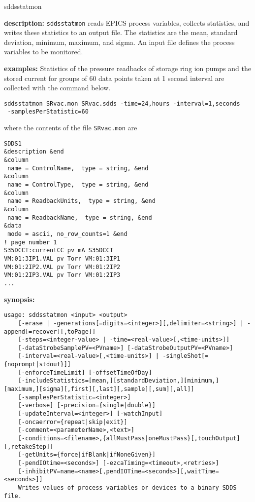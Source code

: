 \begin{sddsprog}{sddsstatmon}
\item \textbf{description:}
\verb+sddsstatmon+ reads EPICS process variables, collects statistics,
and writes these statistics to an output file.
The statistics are the mean, standard deviation, minimum, maximum, and sigma.
An input file defines the process variables to be monitored.
\item \textbf{examples:}
Statistics of the pressure readbacks of storage ring ion pumps and the stored current
for groups of 60 data points taken at 1 second interval are collected
with the command below.
\begin{verbatim}
sddsstatmon SRvac.mon SRvac.sdds -time=24,hours -interval=1,seconds 
 -samplesPerStatistic=60
\end{verbatim}
where the contents of the file \verb+SRvac.mon+ are
\begin{verbatim}
SDDS1
&description &end
&column
 name = ControlName,  type = string, &end
&column
 name = ControlType,  type = string, &end
&column
 name = ReadbackUnits,  type = string, &end
&column
 name = ReadbackName,  type = string, &end
&data
 mode = ascii, no_row_counts=1 &end
! page number 1
S35DCCT:currentCC pv mA S35DCCT
VM:01:3IP1.VAL pv Torr VM:01:3IP1
VM:01:2IP2.VAL pv Torr VM:01:2IP2
VM:01:2IP3.VAL pv Torr VM:01:2IP3
...
\end{verbatim}
\item \textbf{synopsis:}
\begin{verbatim}
usage: sddsstatmon <input> <output>
    [-erase | -generations[=digits=<integer>][,delimiter=<string>] | -append[=recover][,toPage]]
    [-steps=<integer-value> | -time=<real-value>[,<time-units>]]
    [-dataStrobeSamplePV=<PVname>] [-dataStrobeOutputPV=<PVname>]
    [-interval=<real-value>[,<time-units>] | -singleShot[={noprompt|stdout}]]
    [-enforceTimeLimit] [-offsetTimeOfDay]
    [-includeStatistics=[mean,][standardDeviation,][minimum,][maximum,][sigma][,first][,last][,sample][,sum][,all]]
    [-samplesPerStatistic=<integer>]
    [-verbose] [-precision={single|double}]
    [-updateInterval=<integer>] [-watchInput]
    [-oncaerror={repeat|skip|exit}]
    [-comment=<parameterName>,<text>]
    [-conditions=<filename>,{allMustPass|oneMustPass}[,touchOutput][,retakeStep]]
    [-getUnits={force|ifBlank|ifNoneGiven}]
    [-pendIOtime=<seconds>] [-ezcaTiming=<timeout>,<retries>]
    [-inhibitPV=name=<name>[,pendIOTime=<seconds>][,waitTime=<seconds>]]
    Writes values of process variables or devices to a binary SDDS file.

\end{verbatim}
\end{sddsprog}

